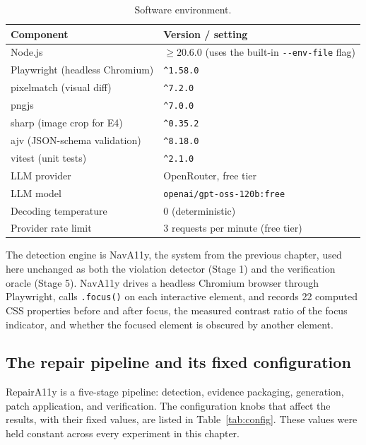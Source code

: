 \documentclass[11pt]{article}
\begin{document}
\begin{table}[h]
\centering
\caption{Software environment.}
\label{tab:env}
\begin{tabular}{ll}
\toprule
Component & Version / setting \\
\midrule
Node.js & $\geq 20.6.0$ (uses the built-in \texttt{-{}-env-file} flag) \\
Playwright (headless Chromium) & \verb|^1.58.0| \\
pixelmatch (visual diff) & \verb|^7.2.0| \\
pngjs & \verb|^7.0.0| \\
sharp (image crop for E4) & \verb|^0.35.2| \\
ajv (JSON-schema validation) & \verb|^8.18.0| \\
vitest (unit tests) & \verb|^2.1.0| \\
LLM provider & OpenRouter, free tier \\
LLM model & \texttt{openai/gpt-oss-120b:free} \\
Decoding temperature & 0 (deterministic) \\
Provider rate limit & 3 requests per minute (free tier) \\
\bottomrule
\end{tabular}
\end{table}

The detection engine is NavA11y, the system from the previous chapter, used here
unchanged as both the violation detector (Stage 1) and the verification oracle
(Stage 5). NavA11y drives a headless Chromium browser through Playwright, calls
\texttt{.focus()} on each interactive element, and records 22 computed CSS properties
before and after focus, the measured contrast ratio of the focus indicator, and
whether the focused element is obscured by another element.

\subsection{The repair pipeline and its fixed configuration}

RepairA11y is a five-stage pipeline: detection, evidence packaging, generation, patch
application, and verification. The configuration knobs that affect the results, with
their fixed values, are listed in Table~\ref{tab:config}. These values were held
constant across every experiment in this chapter.
\end{document}
